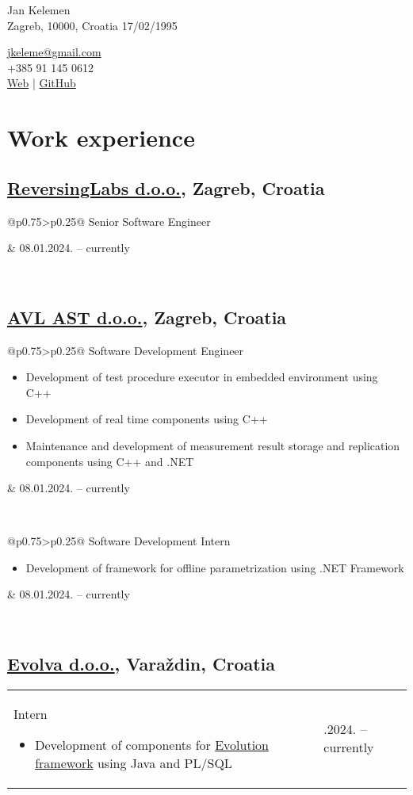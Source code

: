 \documentclass[a4paper]{article}
\makeatletter
\newlength{\tablewidth}
\newenvironment{period}[2]{%
\newcommand{\sarma}{#2}%
\setlength{\tablewidth}{\linewidth}
\addtolength{\tablewidth}{-2\tabcolsep}
\begin{tabular}{@{}p{0.75\tablewidth}>{\raggedleft\arraybackslash}p{0.25\tablewidth}@{}}%
#1 \newline
\begin{itemize}
}{%
\end{itemize} & \sarma \\%
\end{tabular}\\
}
\makeatother
\begin{document}
\fontfamily{\sfdefault}
\selectfont

\begin{minipage}{.5\textwidth}
\LARGE{Jan Kelemen}\\
\normalsize{Zagreb, 10000, Croatia}
\normalsize{17/02/1995}
\end{minipage}%
\begin{minipage}{.5\textwidth}
\raggedleft
\href{mailto:jkeleme@gmail.com}{jkeleme@gmail.com} \\
+385 91 145 0612 \\
\href{http://jan-kelemen.github.io/}{Web} | \href{https://github.com/jan-kelemen}{GitHub}
\end{minipage}

\vspace{1em}

\section{Work experience}
\subsection{\href{https://www.reversinglabs.com/}{ReversingLabs d.o.o.}, Zagreb, Croatia}
\begin{period}{Senior Software Engineer}{08.01.2024. -- currently}
\end{period}
\subsection{\href{https://www.avl.com/}{AVL AST d.o.o.}, Zagreb, Croatia}
\begin{period}{Software Development Engineer}{01.08.2018. -- 31.12.2023.}
        \item
                Development of test procedure executor in embedded environment using C++
        \item
                Development of real time components using C++
        \item
                Maintenance and development of measurement result storage and replication components using C++ and .NET
\end{period}
\begin{period}{Software Development Intern}{17.07.2017. -- 31.07.2018.}
	\item
		Development of framework for offline parametrization using .NET Framework
\end{period}
\subsection{\href{http://www.evolva.hr/hr/index.html}{Evolva d.o.o.}, Vara\v{z}din, Croatia}
\begin{period}{Intern}{22.08.2016. -- 23.09.2016.}
	\item
		Development of components for \href{http://www.evolution-framework.com/}{Evolution framework} using Java and PL/SQL
\end{period}
\end{document}
